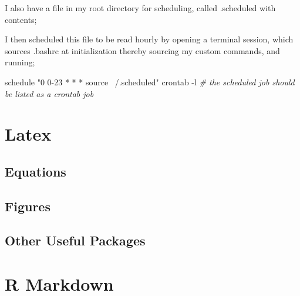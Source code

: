 \documentclass[]{article}
\newenvironment{Shaded}{\begin{snugshade}}{\end{snugshade}}
\newcommand{\StringTok}[1]{\textcolor[rgb]{0.31,0.60,0.02}{#1}}
\newcommand{\CommentTok}[1]{\textcolor[rgb]{0.56,0.35,0.01}{\textit{#1}}}
\newcommand{\FunctionTok}[1]{\textcolor[rgb]{0.00,0.00,0.00}{#1}}
\newcommand{\VariableTok}[1]{\textcolor[rgb]{0.00,0.00,0.00}{#1}}
\newcommand{\BuiltInTok}[1]{#1}
\newcommand{\ExtensionTok}[1]{#1}
\newcommand{\NormalTok}[1]{#1}
\begin{document}
I also have a file in my root directory for scheduling, called
.scheduled with contents;

\begin{Shaded}
\end{Shaded}

I then scheduled this file to be read hourly by opening a terminal
session, which sources .bashrc at initialization thereby sourcing my
custom commands, and running;

\begin{Shaded}
\begin{Highlighting}[]
\ExtensionTok{schedule} \StringTok{"0 0-23 * * * source ~/.scheduled"}
\ExtensionTok{crontab}\NormalTok{ -l }\CommentTok{# the scheduled job should be listed as a crontab job}
\end{Highlighting}
\end{Shaded}

\chapter{Latex}

\section{Equations}

\section{Figures}

\section{Other Useful Packages}

\chapter{R Markdown}
\end{document}
